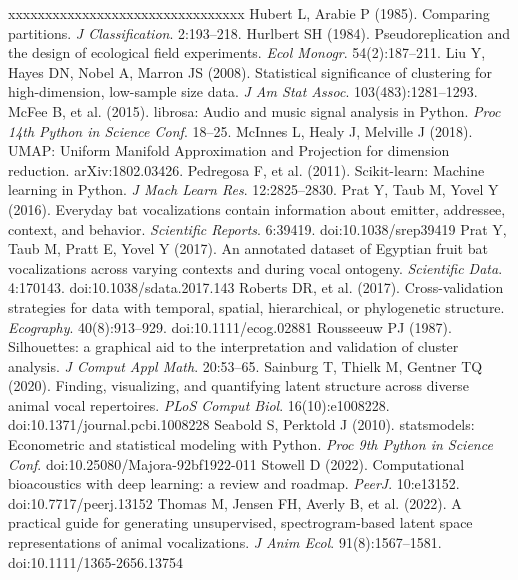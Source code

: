 \begin{thebibliography}{xxxxxxxxxxxxxxxxxxxxxxxxxxxxxxxx}
 Hubert L, Arabie P (1985). Comparing partitions. \emph{J Classification}. 2:193--218.
 Hurlbert SH (1984). Pseudoreplication and the design of ecological field experiments. \emph{Ecol Monogr}. 54(2):187--211.
 Liu Y, Hayes DN, Nobel A, Marron JS (2008). Statistical significance of clustering for high-dimension, low-sample size data. \emph{J Am Stat Assoc}. 103(483):1281--1293.
 McFee B, et al. (2015). librosa: Audio and music signal analysis in Python. \emph{Proc 14th Python in Science Conf}. 18--25.
 McInnes L, Healy J, Melville J (2018). UMAP: Uniform Manifold Approximation and Projection for dimension reduction. arXiv:1802.03426.
 Pedregosa F, et al. (2011). Scikit-learn: Machine learning in Python. \emph{J Mach Learn Res}. 12:2825--2830.
 Prat Y, Taub M, Yovel Y (2016). Everyday bat vocalizations contain information about emitter, addressee, context, and behavior. \emph{Scientific Reports}. 6:39419. doi:10.1038/srep39419
 Prat Y, Taub M, Pratt E, Yovel Y (2017). An annotated dataset of Egyptian fruit bat vocalizations across varying contexts and during vocal ontogeny. \emph{Scientific Data}. 4:170143. doi:10.1038/sdata.2017.143
 Roberts DR, et al. (2017). Cross-validation strategies for data with temporal, spatial, hierarchical, or phylogenetic structure. \emph{Ecography}. 40(8):913--929. doi:10.1111/ecog.02881
 Rousseeuw PJ (1987). Silhouettes: a graphical aid to the interpretation and validation of cluster analysis. \emph{J Comput Appl Math}. 20:53--65.
 Sainburg T, Thielk M, Gentner TQ (2020). Finding, visualizing, and quantifying latent structure across diverse animal vocal repertoires. \emph{PLoS Comput Biol}. 16(10):e1008228. doi:10.1371/journal.pcbi.1008228
 Seabold S, Perktold J (2010). statsmodels: Econometric and statistical modeling with Python. \emph{Proc 9th Python in Science Conf}. doi:10.25080/Majora-92bf1922-011
 Stowell D (2022). Computational bioacoustics with deep learning: a review and roadmap. \emph{PeerJ}. 10:e13152. doi:10.7717/peerj.13152
 Thomas M, Jensen FH, Averly B, et al. (2022). A practical guide for generating unsupervised, spectrogram-based latent space representations of animal vocalizations. \emph{J Anim Ecol}. 91(8):1567--1581. doi:10.1111/1365-2656.13754

\end{thebibliography}
